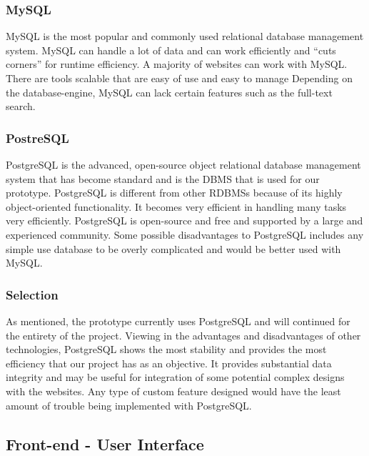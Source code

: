 \documentclass[draftclsnofoot,10pt,onecolumn]{IEEEtran} %
\begin{document}
\subsubsection{MySQL}
MySQL is the most popular and commonly used relational database management system. MySQL can handle a lot of data
and can work efficiently and “cuts corners” for runtime efficiency. A majority of websites can work with MySQL. There are
tools scalable that are easy of use and easy to manage Depending on the database-engine, MySQL can lack certain features
such as the full-text search. \\

\subsubsection{PostreSQL}
PostgreSQL is the advanced, open-source object relational database management system that has become standard and is the
DBMS that is used for our prototype. PostgreSQL is different from other RDBMSs because of its highly object-oriented
functionality. It becomes very efficient in handling many tasks very efficiently. PostgreSQL is open-source and free and
supported by a large and experienced community. Some possible disadvantages to PostgreSQL includes any simple use
database to be overly complicated and would be better used with MySQL. \\

\subsubsection{Selection}
As mentioned, the prototype currently uses PostgreSQL and will continued for the entirety of the project. Viewing in the
advantages and disadvantages of other technologies, PostgreSQL shows the most stability and provides the most efficiency
that our project has as an objective. It provides substantial data integrity and may be useful for integration of some potential
complex designs with the websites. Any type of custom feature designed would have the least amount of trouble being
implemented with PostgreSQL. \\

\subsection{Front-end - User Interface}
\end{document}
